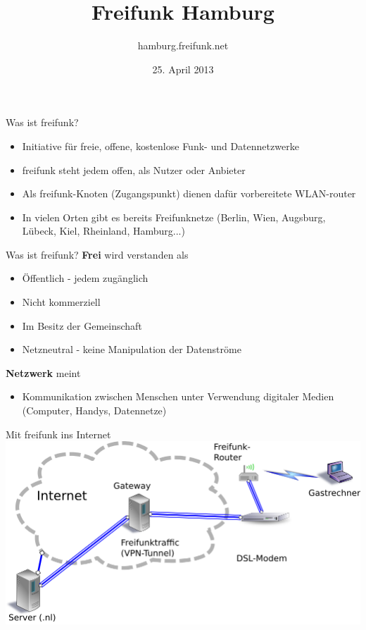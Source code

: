 \documentclass[c]{beamer}
\title{Freifunk Hamburg}
\author{hamburg.freifunk.net}
\date{25. April 2013}
\begin{document}
\maketitle

\begin{frame}{Was ist freifunk?}
	\begin{itemize}
		\item Initiative für freie, offene, kostenlose Funk- und Datennetzwerke
		\item freifunk steht jedem offen, als Nutzer oder Anbieter
		\item Als freifunk-Knoten (Zugangspunkt) dienen dafür vorbereitete WLAN-router
		\item In vielen Orten gibt es bereits Freifunknetze (Berlin, Wien, Augsburg, Lübeck, Kiel, Rheinland, Hamburg...)
	\end{itemize}
\end{frame}


\begin{frame}{Was ist freifunk?}
	\textbf{Frei} wird verstanden als
	\begin{itemize}
		\item Öffentlich - jedem zugänglich
		\item Nicht kommerziell
		\item Im Besitz der Gemeinschaft
		\item Netzneutral - keine Manipulation der Datenströme
	\end{itemize}
	\textbf{Netzwerk} meint
	\begin{itemize}
		\item Kommunikation zwischen Menschen unter Verwendung digitaler Medien (Computer, Handys, Datennetze)
	\end{itemize}
\end{frame}



\begin{frame}{Mit freifunk ins Internet}
	\includegraphics[width=\textwidth]{Freifunk_Knotenanbindung}
\end{frame}
\end{document}
